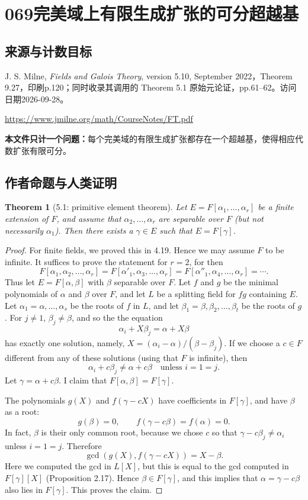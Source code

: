 \documentclass[UTF8,11pt]{ctexart}
\newtheorem*{theorem}{Theorem}
\theoremstyle{definition}
\begin{document}
\section*{069\quad 完美域上有限生成扩张的可分超越基}
\subsection*{来源与计数目标}
J. S. Milne, \emph{Fields and Galois Theory}, version 5.10, September 2022，Theorem 9.27，印刷p.120；同时收录其调用的 Theorem 5.1 原始元论证，pp.61--62。访问日期2026-09-28。
\par\url{https://www.jmilne.org/math/CourseNotes/FT.pdf}
\par\textbf{本文件只计一个问题：}每个完美域的有限生成扩张都存在一个超越基，使得相应代数扩张有限可分。
\subsection*{作者命题与人类证明}
\begin{theorem}[5.1: primitive element theorem]
Let $E=F[\alpha_1,\ldots,\alpha_r]$ be a finite extension of $F$, and assume that $\alpha_2,\ldots,\alpha_r$ are separable over $F$ (but not necessarily $\alpha_1$). Then there exists a $\gamma\in E$ such that $E=F[\gamma]$.
\end{theorem}
\begin{proof}
For finite fields, we proved this in 4.19. Hence we may assume $F$ to be infinite. It suffices to prove the statement for $r=2$, for then
\[F[\alpha_1,\alpha_2,\ldots,\alpha_r]=F[\alpha'_1,\alpha_3,\ldots,\alpha_r]=F[\alpha''_1,\alpha_4,\ldots,\alpha_r]=\cdots.\]
Thus let $E=F[\alpha,\beta]$ with $\beta$ separable over $F$. Let $f$ and $g$ be the minimal polynomials of $\alpha$ and $\beta$ over $F$, and let $L$ be a splitting field for $fg$ containing $E$. Let $\alpha_1=\alpha,\ldots,\alpha_s$ be the roots of $f$ in $L$, and let $\beta_1=\beta,\beta_2,\ldots,\beta_t$ be the roots of $g$. For $j\ne1$, $\beta_j\ne\beta$, and so the the equation
\[\alpha_i+X\beta_j=\alpha+X\beta\]
has exactly one solution, namely, $X=(\alpha_i-\alpha)/(\beta-\beta_j)$. If we choose a $c\in F$ different from any of these solutions (using that $F$ is infinite), then
\[\alpha_i+c\beta_j\ne\alpha+c\beta\quad\text{unless }i=1=j.\]
Let $\gamma=\alpha+c\beta$. I claim that $F[\alpha,\beta]=F[\gamma]$.

The polynomials $g(X)$ and $f(\gamma-cX)$ have coefficients in $F[\gamma]$, and have $\beta$ as a root:
\[g(\beta)=0,\qquad f(\gamma-c\beta)=f(\alpha)=0.\]
In fact, $\beta$ is their only common root, because we chose $c$ so that $\gamma-c\beta_j\ne\alpha_i$ unless $i=1=j$. Therefore
\[\gcd(g(X),f(\gamma-cX))=X-\beta.\]
Here we computed the gcd in $L[X]$, but this is equal to the gcd computed in $F[\gamma][X]$ (Proposition 2.17). Hence $\beta\in F[\gamma]$, and this implies that $\alpha=\gamma-c\beta$ also lies in $F[\gamma]$. This proves the claim.
\end{proof}
\end{document}
